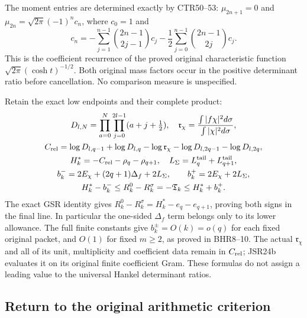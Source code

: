 The moment entries are determined exactly by CTR50--53:
$\mu_{2n+1}=0$ and $\mu_{2n}=\sqrt{2\pi}(-1)^nc_n$,
where $c_0=1$ and
\begin{equation}
 c_n=-\sum_{j=1}^{n-1}\binom{2n-1}{2j-1}c_j
          -\frac12\sum_{j=0}^{n-1}\binom{2n-1}{2j}c_j.
\end{equation}
This is the coefficient recurrence of the proved original
characteristic function $\sqrt{2\pi}(\cosh t)^{-1/2}$.
Both original mass factors occur in the positive determinant
ratio before cancellation. No comparison measure is unspecified.

Retain the exact low endpoints and their complete product:
\begin{equation}
\begin{gathered}
 D_{l,N}=\prod_{a=0}^N\prod_{j=0}^{2l-1}(a+j+\tfrac12),\quad
 \mathfrak r_\chi=\frac{\int|f\chi|^2d\sigma}{\int|\chi|^2d\sigma},\\
 C_{\rm rel}=\log D_{l,q-1}+\log D_{l,q}
 -\log\mathfrak r_\chi-\log D_{l,2q-1}-\log D_{l,2q},\\
 H_k^*=-C_{\rm rel}-\rho_q-\rho_{q+1},\quad
 L_\Sigma=L_q^{\rm tail}+L_{q+1}^{\rm tail},\\
 b_k^-=2E_\chi+(2q+1)\Delta_f+2L_\Sigma,\qquad
 b_k^+=2E_\chi+2L_\Sigma,\\
 H_k^*-b_k^-\leq R_k^0-R_k^\sigma=-\mathfrak T_k
                         \leq H_k^*+b_k^+.
\end{gathered}\label{eq:universal-return}
\end{equation}
The exact GSR identity gives
$R_k^0-R_k^\sigma=H_k^*-e_q-e_{q+1}$, proving both
signs in the final line. In particular the one-sided
$\Delta_f$ term belongs only to its lower allowance.
The full finite constants give $b_k^\pm=O(k)=o(q)$ for
each fixed original packet, and $O(1)$ for fixed $m\geq2$,
as proved in BHR8--10. The actual $\mathfrak r_\chi$ and
all of its unit, multiplicity and coefficient data remain
in $C_{\rm rel}$; JSR24b evaluates it on its original finite
coefficient Gram. These formulas do not assign a leading
value to the universal Hankel determinant ratios.

\subsection{Return to the original arithmetic criterion}